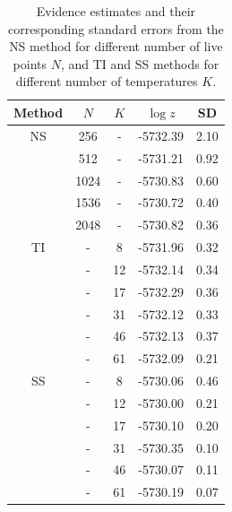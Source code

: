 \documentclass[aps,reprint,amsmath,amssymb,showpacs,showkeys]{revtex4-1}%
\begin{document}
\begin{table}
	\caption{\label{tab:results} Evidence estimates and their corresponding standard errors from the NS method for different number of live points $N$, and TI and SS methods for different number of temperatures $K$.}
	\begin{ruledtabular}
		\begin{tabular}{ccccc}
			Method & $N$ & $K$ & $\log z$& SD   \\ \hline
			NS     & 256 & -   &-5732.39 & 2.10 \\ 
			       & 512 & -   &-5731.21 & 0.92 \\ 
			       &1024 & -   &-5730.83 & 0.60 \\ 
			       &1536 & -   &-5730.72 & 0.40 \\ 
			       &2048 & -   &-5730.82 & 0.36 \\ \hline 
			TI     &  -  & 8   &-5731.96 & 0.32 \\
			       &  -  & 12  &-5732.14 & 0.34 \\
			       &  -  & 17  &-5732.29 & 0.36 \\
			       &  -  & 31  &-5732.12 & 0.33 \\ 
   			       &  -  & 46  &-5732.13 & 0.37 \\ 
   			       &  -  & 61  &-5732.09 & 0.21 \\ \hline
			SS     &  -  & 8   &-5730.06 & 0.46 \\
			       &  -  & 12  &-5730.00 & 0.21 \\
			       &  -  & 17  &-5730.10 & 0.20 \\
			       &  -  & 31  &-5730.35 & 0.10 \\
   			       &  -  & 46  &-5730.07 & 0.11 \\
   			       &  -  & 61  &-5730.19 & 0.07 \\
		\end{tabular}
	\end{ruledtabular}
\end{table}
\end{document}
